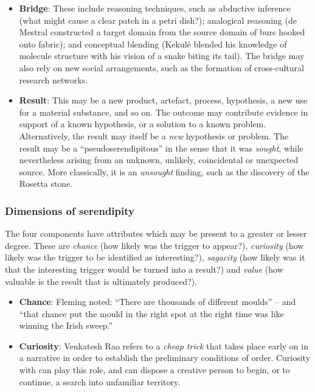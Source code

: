 \begin{itemize}
\item \textbf{Bridge}: These include reasoning techniques, such as
  abductive inference (what might cause a clear patch in a petri
  dish?); analogical reasoning (de Mestral constructed a target domain
  from the source domain of burs hooked onto fabric); and conceptual
  blending (Kekul\'e blended his knowledge of molecule structure with
  his vision of a snake biting its tail).  The bridge may also rely on
  new social arrangements, such as the formation of cross-cultural
  research networks.
\end{itemize}

\begin{itemize}
\item \textbf{Result}: This may be a new product, artefact, process,
  hypothesis, a new use for a material substance, and so on.  The
  outcome may contribute evidence in support of a known hypothesis, or
  a solution to a known problem.  Alternatively, the result may itself
  be a {\em new} hypothesis or problem.  The result may be a
  ``pseudoserendipitous'' in the sense that it was {\em sought}, while
  nevertheless arising from an unknown, unlikely, coincidental or
  unexpected source.  More classically, it is an \emph{unsought}
  finding, such as the discovery of the Rosetta stone.
\end{itemize}

\subsubsection*{Dimensions of serendipity}

The four components have attributes which may be present to a greater or lesser degree.  These are \emph{chance} (how likely was the trigger to appear?), \emph{curiosity} (how likely was the trigger to be identified as interesting?), \emph{sagacity} (how likely was it that the interesting trigger would be turned into a result?) and \emph{value} (how valuable is the result that is ultimately produced?).

\begin{itemize}
\item \textbf{Chance}: Fleming \citeyear{fleming} noted: ``There are
  thousands of different moulds'' -- and ``that chance put the mould
  in the right spot at the right time was like winning the Irish
  sweep.''
\end{itemize}

\begin{itemize}
\item \textbf{Curiosity}: Venkatesh Rao \citeyear{rao2011tempo} refers
  to a \emph{cheap trick} that takes place early on in a narrative in
  order to establish the preliminary conditions of order.  Curiosity
  with can play this role, and can dispose a creative person to begin,
  or to continue, a search into unfamiliar territory.
\end{itemize}

